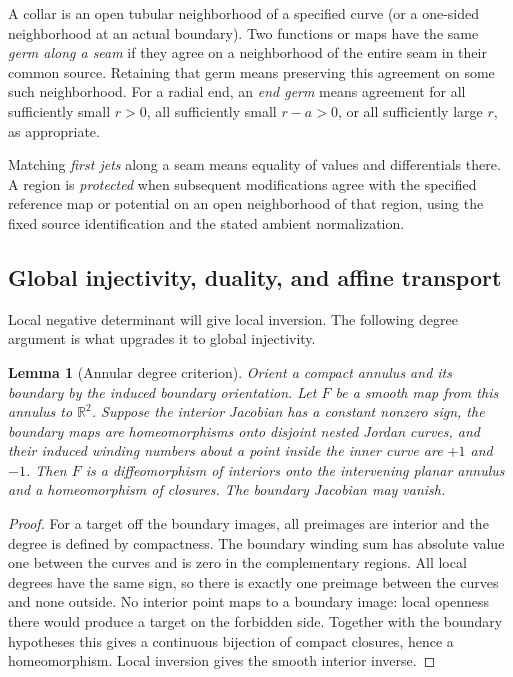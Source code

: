\documentclass[11pt]{amsart}
\newtheorem{lemma}[theorem]{Lemma}
\theoremstyle{definition}
\theoremstyle{remark}
\newcommand{\R}{\mathbb R}\newcommand{\Sph}{\mathbb S}
\numberwithin{equation}{section}
\begin{document}
A collar is an open tubular
neighborhood of a specified curve (or a one-sided neighborhood at an
actual boundary). Two functions or maps have the same \emph{germ along
a seam} if they agree on a neighborhood of the entire seam in their
common source. Retaining that germ means preserving this agreement on
some such neighborhood. For a radial end, an \emph{end germ} means
agreement for all sufficiently small $r>0$, all sufficiently small
$r-a>0$, or all sufficiently large $r$, as appropriate.

Matching \emph{first jets} along a seam means equality of values and
differentials there. A region is \emph{protected} when subsequent
modifications agree with the specified reference map or potential on an open
neighborhood of that region, using the fixed source identification
and the stated ambient normalization.

\subsection{Global injectivity, duality, and affine transport}
Local negative determinant will give local inversion. The following
degree argument is what upgrades it to global injectivity.
\begin{lemma}[Annular degree criterion]\label{lem:degree}
Orient a compact annulus and its boundary by the induced boundary
orientation. Let $F$ be a smooth map from this annulus to $\R^2$. Suppose the
interior Jacobian has a constant nonzero sign, the boundary maps are
homeomorphisms onto disjoint nested Jordan curves, and their induced
winding numbers about a point inside the inner curve are $+1$ and $-1$.
Then $F$ is a diffeomorphism of interiors
onto the intervening planar annulus and a homeomorphism of closures.
The boundary Jacobian may vanish.
\end{lemma}
\begin{proof}
For a target off the boundary images, all preimages are interior and the
degree is defined by compactness. The boundary winding sum has absolute
value one between the curves and is zero in the complementary regions.
All local degrees have the same sign, so there is exactly one preimage
between the curves and none outside. No interior point maps to a boundary
image: local openness there would produce a target on the forbidden side.
Together with the boundary hypotheses this gives a continuous bijection
of compact closures, hence a homeomorphism. Local inversion gives the
smooth interior inverse.
\end{proof}
\end{document}

